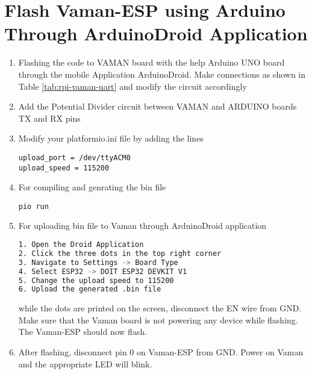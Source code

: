 \documentclass[12pt]{article}
\begin{document}
\section{Flash Vaman-ESP using Arduino Through ArduinoDroid Application}

\renewcommand{\theequation}{\theenumi}
\renewcommand{\thefigure}{\theenumi}
\begin{enumerate}[label=\thesubsection.\arabic*.,ref=\thesubsection.\theenumi]
\item Flashing the code to VAMAN board with the help Arduino UNO board through the mobile Application ArduinoDroid. Make connections as shown in Table \ref{tab:rpi-vaman-uart} and modify the circuit accordingly
			\begin{table}[!h]
		
		\caption{}
		\label{tab:rpi-vaman-uart}
	\end{table}
\item Add the Potential Divider circuit between VAMAN and ARDUINO boards TX and RX pins
\item Modify your platformio.ini file by adding the lines
\begin{lstlisting}
upload_port = /dev/ttyACM0
upload_speed = 115200
\end{lstlisting}

\item For compiling and genrating the bin file 
\begin{lstlisting}
pio run
\end{lstlisting}
\item For uploading bin file to Vaman through ArduinoDroid application 
\begin{lstlisting}[language=bash]
1. Open the Droid Application
2. Click the three dots in the top right corner
3. Navigate to Settings -> Board Type
4. Select ESP32 -> DOIT ESP32 DEVKIT V1
5. Change the upload speed to 115200
6. Upload the generated .bin file
\end{lstlisting}



while the dots are printed on the screen, disconnect the EN wire from GND.   Make sure that the Vaman board is not powering any device while flashing.  The Vaman-ESP should now flash.
\item After flashing, disconnect pin 0 on Vaman-ESP from GND. Power on Vaman and the appropriate LED will blink.
\end{enumerate}
\end{document}
